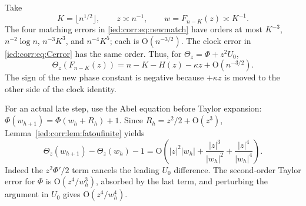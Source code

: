 \documentclass[11pt,letterpaper]{article}
\theoremstyle{remark}\newtheorem{remark}[theorem]{Remark}
\newcommand{\Oh}{\mathrm O}\newcommand{\supp}{\operatorname{supp}}
\begin{document}
Take
\begin{equation}\label{ied:corr:eq:scales}
 K=\lfloor n^{1/2}\rfloor,\qquad z\asymp n^{-1},\qquad
 w=F_{n-K}(z)\asymp K^{-1}.
\end{equation}
The four matching errors in \eqref{ied:corr:eq:newmatch} have orders at most
$K^{-3}$, $n^{-2}\log n$, $n^{-3}K^3$, and $n^{-4}K^5$; each is $\Oh(n^{-3/2})$. The clock error in \eqref{ied:corr:eq:Cerror} has the same order. Thus, for $\Theta_z=\Phi+z^2U_0$,
\begin{equation}\label{ied:corr:eq:newentry}
 \Theta_z(F_{n-K}(z))=n-K-H(z)-\kappa z+\Oh(n^{-3/2}).
\end{equation}
The sign of the new phase constant is negative because $+\kappa z$ is moved to the other side of the clock identity.

For an actual late step, use the Abel equation before Taylor expansion:
$\Phi(w_{h+1})=\Phi(w_h+R_h)+1$. Since $R_h=z^2/2+\Oh(z^3)$, Lemma~\ref{ied:corr:lem:fatoufinite} yields
\begin{equation}\label{ied:corr:eq:cocycle}
 \Theta_z(w_{h+1})-\Theta_z(w_h)-1
 =\Oh\left(|z|^2|w_h|+\frac{|z|^3}{|w_h|^2}
                             +\frac{|z|^4}{|w_h|^4}\right).
\end{equation}
Indeed the $z^2\Phi'/2$ term cancels the leading $U_0$ difference. The second-order Taylor error for $\Phi$ is $\Oh(z^4/w_h^3)$, absorbed by the last term, and perturbing the argument in $U_0$ gives $\Oh(z^4/w_h^4)$.
\end{document}
